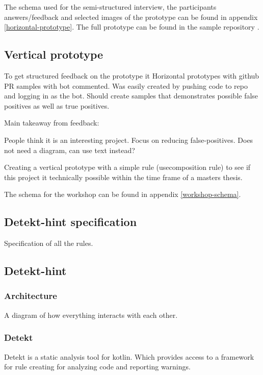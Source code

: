\documentclass{report}
\begin{document}

The schema used for the semi-structured interview, the participants answers/feedback and selected images of the prototype can be found in appendix \ref{horizontal-prototype}. The full prototype can be found in the sample repository \cite{sample-repository}. 

\subsection{Vertical prototype}
To get structured feedback on the prototype it 
Horizontal prototypes with github PR samples with bot commented. Was easily created by pushing code to repo and logging in as the bot. Should create samples that demonstrates possible false positives as well as true positives. 

Main takeaway from feedback: 

People think it is an interesting project.
Focus on reducing false-positives.
Does not need a diagram, can use text instead?



Creating a vertical prototype with a simple rule (usecomposition rule) to see if this project it technically possible within the time frame of a masters thesis. 

The schema for the workshop can be found in appendix \ref{workshop-schema}.


\subsection{Detekt-hint specification}
Specification of all the rules.

\subsection{Detekt-hint}

\subsubsection{Architecture}
A diagram of how everything interacts with each other.

\subsubsection{Detekt}
Detekt is a static analysis tool for kotlin. Which provides access to a framework for rule creating for analyzing code and reporting warnings.
\end{document}
